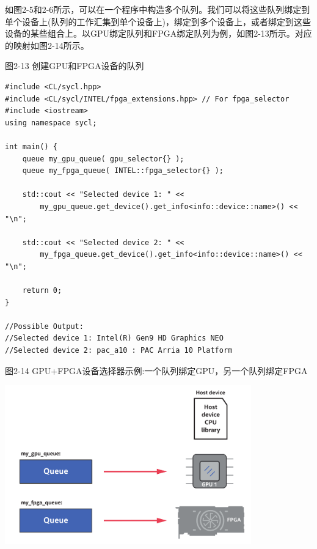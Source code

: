 如图2-5和2-6所示，可以在一个程序中构造多个队列。我们可以将这些队列绑定到单个设备上(队列的工作汇集到单个设备上)，绑定到多个设备上，或者绑定到这些设备的某些组合上。以GPU绑定队列和FPGA绑定队列为例，如图2-13所示。对应的映射如图2-14所示。\par

图2-13 创建GPU和FPGA设备的队列
\begin{lstlisting}[caption={}]
#include <CL/sycl.hpp>
#include <CL/sycl/INTEL/fpga_extensions.hpp> // For fpga_selector
#include <iostream>
using namespace sycl;

int main() {
	queue my_gpu_queue( gpu_selector{} );
	queue my_fpga_queue( INTEL::fpga_selector{} );
	
	std::cout << "Selected device 1: " <<
		my_gpu_queue.get_device().get_info<info::device::name>() << "\n";
		
	std::cout << "Selected device 2: " <<
		my_fpga_queue.get_device().get_info<info::device::name>() << "\n";
	
	return 0;
}

//Possible Output:
//Selected device 1: Intel(R) Gen9 HD Graphics NEO
//Selected device 2: pac_a10 : PAC Arria 10 Platform
\end{lstlisting}

\hspace*{\fill} \par %
图2-14 GPU+FPGA设备选择器示例:一个队列绑定GPU，另一个队列绑定FPGA
\begin{center}
	\includegraphics[width=0.8\textwidth]{content/chapter-2/images/8}
\end{center}












